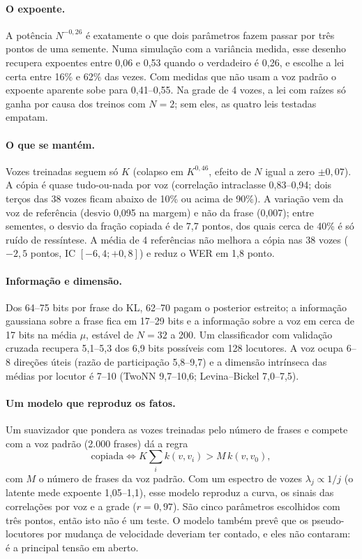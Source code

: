 \documentclass[a4paper,11pt]{article}
\begin{document}
\paragraph{O expoente.} A potência $N^{-0{,}26}$ é exatamente o que dois parâmetros fazem passar por três pontos de uma semente. Numa simulação com a variância medida, esse desenho recupera expoentes entre 0,06 e 0,53 quando o verdadeiro é 0,26, e escolhe a lei certa entre 16\% e 62\% das vezes. Com medidas que não usam a voz padrão o expoente aparente sobe para 0,41--0,55. Na grade de 4 vozes, a lei com raízes só ganha por causa dos treinos com $N=2$; sem eles, as quatro leis testadas empatam.

\paragraph{O que se mantém.} Vozes treinadas seguem só $K$ (colapso em $K^{0{,}46}$, efeito de $N$ igual a zero $\pm 0{,}07$). A cópia é quase tudo-ou-nada por voz (correlação intraclasse 0,83--0,94; dois terços das 38 vozes ficam abaixo de 10\% ou acima de 90\%). A variação vem da voz de referência (desvio 0,095 na margem) e não da frase (0,007); entre sementes, o desvio da fração copiada é de 7,7 pontos, dos quais cerca de 40\% é só ruído de ressíntese. A média de 4 referências não melhora a cópia nas 38 vozes ($-2{,}5$ pontos, IC $[-6{,}4; +0{,}8]$) e reduz o WER em 1,8 ponto.

\paragraph{Informação e dimensão.} Dos 64--75 bits por frase do KL, 62--70 pagam o posterior estreito; a informação gaussiana sobre a frase fica em 17--29 bits e a informação sobre a voz em cerca de 17 bits na média $\mu$, estável de $N=32$ a 200. Um classificador com validação cruzada recupera 5,1--5,3 dos 6,9 bits possíveis com 128 locutores. A voz ocupa 6--8 direções úteis (razão de participação 5,8--9,7) e a dimensão intrínseca das médias por locutor é 7--10 (TwoNN 9,7--10,6; Levina--Bickel 7,0--7,5).

\paragraph{Um modelo que reproduz os fatos.} Um suavizador que pondera as vozes treinadas pelo número de frases e compete com a voz padrão (2.000 frases) dá a regra
\[
\text{copiada} \iff K\textstyle\sum_i k(v,v_i) > M\,k(v,v_0),
\]
com $M$ o número de frases da voz padrão. Com um espectro de vozes $\lambda_j\propto 1/j$ (o latente mede expoente 1,05--1,1), esse modelo reproduz a curva, os sinais das correlações por voz e a grade ($r=0{,}97$). São cinco parâmetros escolhidos com três pontos, então isto não é um teste. O modelo também prevê que os pseudo-locutores por mudança de velocidade deveriam ter contado, e eles não contaram: é a principal tensão em aberto.
\end{document}
